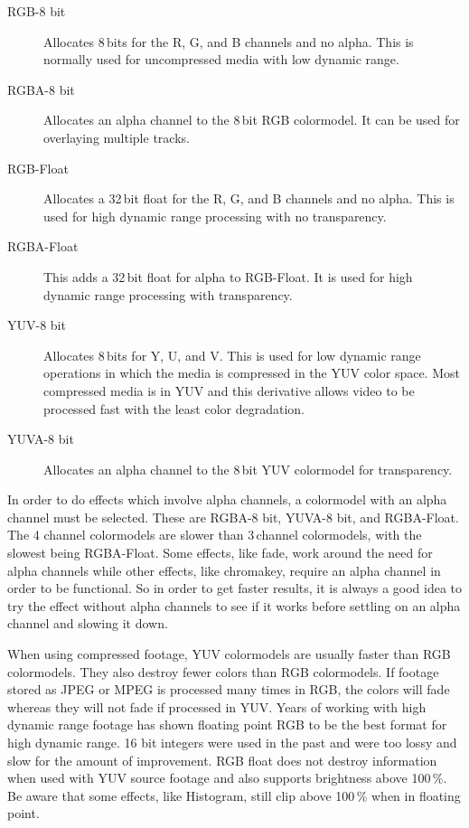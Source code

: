\begin{description}
        \begin{description}
            \item[RGB-8 bit] 
                Allocates 8\,bits for the R, G, and B channels and no alpha. This is normally used for uncompressed media with low dynamic range.
            \item[RGBA-8 bit]
                Allocates an alpha channel to the 8\,bit RGB colormodel. It can be used for overlaying multiple tracks.\\
            \item[RGB-Float]
                Allocates a 32\,bit float for the R, G, and B channels and no alpha. This is used  for high dynamic range processing with no transparency.
            \item[RGBA-Float]
                This adds a 32\,bit float for alpha to RGB-Float. It is used for high dynamic range processing with transparency.\\
            \item[YUV-8 bit]
                Allocates 8\,bits for Y, U, and V. This is used for low dynamic range operations in which the media is compressed in the YUV color space. Most compressed media is in YUV and this derivative allows video to be processed fast with the least color degradation.
            \item[YUVA-8 bit]
                Allocates an alpha channel to the 8\,bit YUV colormodel for transparency.
        \end{description}       
                In order to do effects which involve alpha channels, a colormodel with an alpha channel must be selected. 
                These are RGBA-8 bit, YUVA-8 bit, and RGBA-Float. 
                The 4 channel colormodels are slower than 3\,channel colormodels, with the slowest being RGBA-Float. 
                Some effects, like fade, work around the need for alpha channels while other effects, like chromakey, require an alpha channel in order to be functional.  
                So in order to get faster results, it is always a good idea to try the effect without alpha channels to see if it works before settling on an alpha channel and slowing it down.

                When using compressed footage, YUV colormodels are usually faster than RGB colormodels. 
                They also destroy fewer colors than RGB colormodels. 
                If footage stored as JPEG or MPEG is processed many times in RGB, the colors will fade whereas they will not fade if processed in YUV.  
                Years of working with high dynamic range footage has shown floating point RGB to be the best format for high dynamic range. 
                16 bit integers were used in the past and were too lossy and slow for the amount of improvement.  
                RGB float does not destroy information when used with YUV source footage and also supports brightness above 100\,\%. 
                Be aware that some effects, like Histogram, still clip above 100\,\% when in floating point.
        

\end{description}
